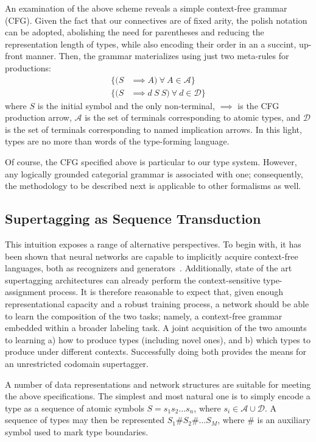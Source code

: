 An examination of the above scheme reveals a simple context-free grammar (CFG).
Given the fact that our connectives are of fixed arity, the polish notation~\cite{hamblin1962translation} can be adopted, abolishing the need for parentheses and reducing the representation length of types, while also encoding their order in an a succint, up-front manner.
Then, the grammar materializes using just two meta-rules for productions:
\begin{align}
\{ (S & \implies A) \  \forall \ A \in \mathcal{A} \}
\\
\{(S & \implies d \ S \ S) \ \forall \ d \in \mathcal{D} \}
\label{eqn:cfg}
\end{align}
where $S$ is the initial symbol and the only non-terminal, $\implies$ is the CFG production arrow, $\mathcal{A}$ is the set of terminals corresponding to atomic types, and $\mathcal{D}$ is the set of terminals corresponding to named implication arrows.
In this light, types are no more than words of the type-forming language.

Of course, the CFG specified above is particular to our type system.
However, any logically grounded categorial grammar is associated with one; consequently, the methodology to be described next is applicable to other formalisms as well. 

\subsection{Supertagging as Sequence Transduction}
This intuition exposes a range of alternative perspectives.
To begin with, it has been shown that neural networks are capable to implicitly acquire context-free languages, both as recognizers and generators~\cite{noPhysics}.
Additionally, state of the art supertagging architectures can already perform the context-sensitive type-assignment process.
It is therefore reasonable to expect that, given enough representational capacity and a robust training process, a network should be able to learn the composition of the two tasks; namely, a context-free grammar embedded within a broader labeling task.
A joint acquisition of the two amounts to learning a) how to produce types (including novel ones), and b) which types to produce under different contexts.
Successfully doing both provides the means for an unrestricted codomain supertagger.

A number of data representations and network structures are suitable for meeting the above specifications.
The simplest and most natural one is to simply encode a type as a sequence of atomic symbols $S = s_1 s_2\dots s_n$, where $s_i \in \mathcal{A}\cup\mathcal{D}$.
A sequence of types may then be represented $S_1 \# S_2 \# \dots S_M$, where \# is an auxiliary symbol used to mark type boundaries.

